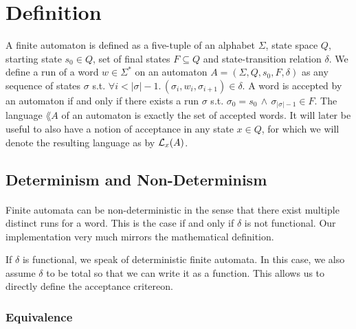 \documentclass[11pt,a4paper,oneside]{book}
\begin{document}
        \section{Definition}
            A finite automaton is defined as a five-tuple of an alphabet $\Sigma$, state space $Q$, starting state $s_0 \in Q$, set of final states $F \subseteq Q$ and state-transition relation $\delta$. 
            We define a run of a word $w \in \Sigma^*$ on an automaton $A = (\Sigma, Q, s_0, F, \delta)$ as any sequence of states $\sigma$ s.t. $\forall i < \vert\sigma\vert-1. \, (\sigma_i, w_i, \sigma_{i+1}) \in \delta$.
            A word is accepted by an automaton if and only if there exists a run $\sigma$ s.t. $\sigma_0 = s_0 \, \wedge \, \sigma_{\vert\sigma\vert-1} \in F$. The language $\lang{A}$ of an automaton is exactly the set of accepted words. It will later be useful to also have a notion of acceptance in any state $x \in Q$, for which we will denote the resulting language as by $\mathcal{L}_x(A)$.

            \subsection{Determinism and Non-Determinism}
                \paragraph{} 
                Finite automata can be non-deterministic in the sense that there exist multiple distinct runs for a word. This is the case if and only if $\delta$ is not functional. Our implementation very much mirrors the mathematical definition.



                If $\delta$ is functional, we speak of deterministic finite automata. In this case, we also assume $\delta$ to be total so that we can write it as a function. 
                This allows us to directly define the acceptance critereon. 


                \subsubsection{Equivalence}
\end{document}
